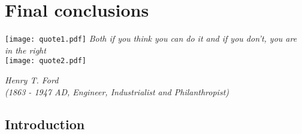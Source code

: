 \chapter{Final conclusions}\label{cap:finalconclusions} 

\epigraph{\texttt{[image: quote1.pdf]} \emph{Both if you think you can do it and if you don’t, you are in the right} \\ \texttt{[image: quote2.pdf]}}{\emph{Henry T. Ford \\ (1863 - 1947 AD, Engineer, Industrialist and Philanthropist)}}

\section{Introduction}

\lipsum

\ifchapterbib
    
\fi
